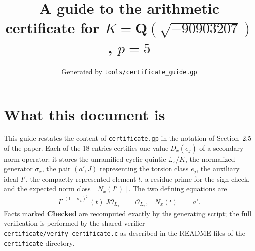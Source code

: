 \documentclass[11pt]{article}
\title{A guide to the arithmetic certificate for $K=\mathbf Q(\sqrt{-90903207})$, $p=5$}
\author{}
\date{Generated by \texttt{tools/certificate\_guide.gp}}
\begin{document}
\maketitle
\section*{What this document is}
This guide restates the content of \texttt{certificate.gp} in the
notation of Section~2.5 of the paper.  Each of the 18 entries
certifies one value $D_x(e_j)$ of a secondary norm operator: it
stores the unramified cyclic quintic $L_x/K$, the normalized
generator $\sigma_x$, the pair $(a',J)$ representing the torsion
class $e_j$, the auxiliary ideal $I'$, the compactly represented
element $t$, a residue prime for the sign check, and the expected
norm class $[N_x(I')]$.  The two defining equations are
\begin{align*}
I'^{\,(1-\sigma_x)^2}\,(t)\,J\mathcal O_{L_x}&=\mathcal O_{L_x},&
N_x(t)&=a'.
\end{align*}
Facts marked \textbf{Checked} are recomputed exactly by the
generating script; the full verification is performed by the
shared verifier \texttt{certificate/verify\_certificate.c} as
described in the README files of the \texttt{certificate}
directory.
\end{document}
